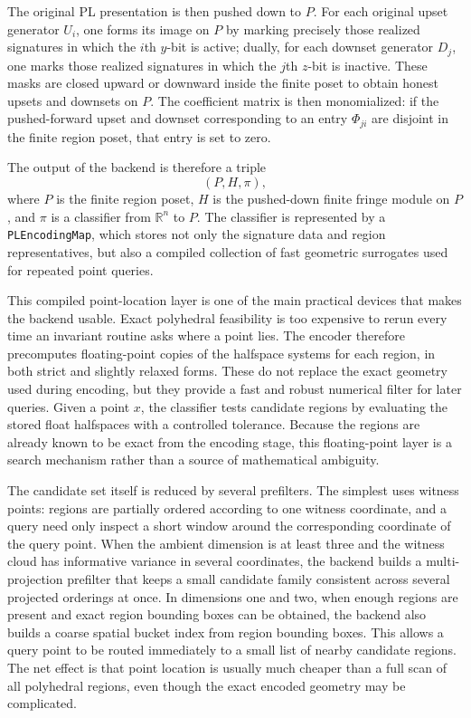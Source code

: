 \documentclass[11pt]{article}
\newcommand{\R}{\mathbb{R}}
\theoremstyle{definition}
\theoremstyle{remark}
\begin{document}
The original PL presentation is then pushed down to \(P\).  For each original upset generator \(U_i\), one forms its image on \(P\) by marking precisely those realized signatures in which the \(i\)th \(y\)-bit is active; dually, for each downset generator \(D_j\), one marks those realized signatures in which the \(j\)th \(z\)-bit is inactive.  These masks are closed upward or downward inside the finite poset to obtain honest upsets and downsets on \(P\).  The coefficient matrix is then monomialized: if the pushed-forward upset and downset corresponding to an entry \(\Phi_{ji}\) are disjoint in the finite region poset, that entry is set to zero.

The output of the backend is therefore a triple
\[
(P,H,\pi),
\]
where \(P\) is the finite region poset, \(H\) is the pushed-down finite fringe module on \(P\), and \(\pi\) is a classifier from \(\R^n\) to \(P\).  The classifier is represented by a \texttt{PLEncodingMap}, which stores not only the signature data and region representatives, but also a compiled collection of fast geometric surrogates used for repeated point queries.

This compiled point-location layer is one of the main practical devices that makes the backend usable.  Exact polyhedral feasibility is too expensive to rerun every time an invariant routine asks where a point lies.  The encoder therefore precomputes floating-point copies of the halfspace systems for each region, in both strict and slightly relaxed forms.  These do not replace the exact geometry used during encoding, but they provide a fast and robust numerical filter for later queries.  Given a point \(x\), the classifier tests candidate regions by evaluating the stored float halfspaces with a controlled tolerance.  Because the regions are already known to be exact from the encoding stage, this floating-point layer is a search mechanism rather than a source of mathematical ambiguity.

The candidate set itself is reduced by several prefilters.  The simplest uses witness points: regions are partially ordered according to one witness coordinate, and a query need only inspect a short window around the corresponding coordinate of the query point.  When the ambient dimension is at least three and the witness cloud has informative variance in several coordinates, the backend builds a multi-projection prefilter that keeps a small candidate family consistent across several projected orderings at once.  In dimensions one and two, when enough regions are present and exact region bounding boxes can be obtained, the backend also builds a coarse spatial bucket index from region bounding boxes.  This allows a query point to be routed immediately to a small list of nearby candidate regions.  The net effect is that point location is usually much cheaper than a full scan of all polyhedral regions, even though the exact encoded geometry may be complicated.
\end{document}

